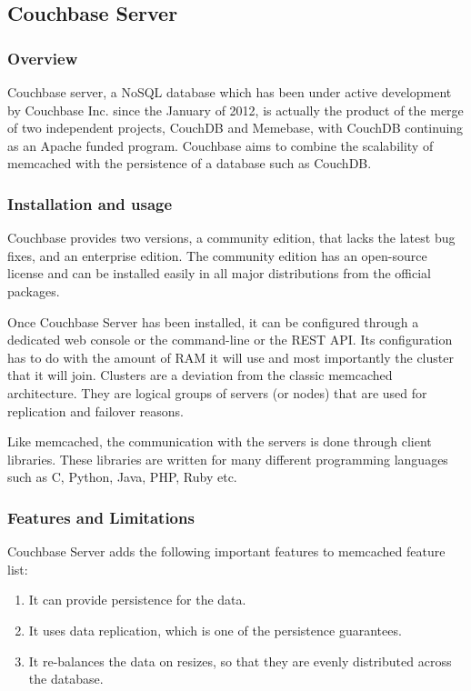 \subsection{Couchbase Server}

\subsubsection{Overview}

Couchbase server, a NoSQL database which has been under active development by 
Couchbase Inc.  since the January of 2012, is actually the product of the merge 
of two independent projects, CouchDB and Memebase, with CouchDB continuing as 
an Apache funded program.  Couchbase aims to combine the scalability of 
memcached with the persistence of a database such as CouchDB. 

\subsubsection{Installation and usage}

Couchbase provides two versions, a community edition, that lacks the latest bug 
fixes, and an enterprise edition. The community edition has an open-source 
license and can be installed easily in all major distributions from the 
official packages.

Once Couchbase Server has been installed, it can be configured through a 
dedicated web console or the command-line or the REST API. Its configuration 
has to do with the amount of RAM it will use and most importantly the cluster 
that it will join. Clusters are a deviation from the classic memcached 
architecture. They are logical groups of servers (or nodes) that are used for 
replication and failover reasons.

Like memcached, the communication with the servers is done through client 
libraries. These libraries are written for many different programming languages 
such as C, Python, Java, PHP, Ruby etc.

\subsubsection{Features and Limitations}

Couchbase Server adds the following important features to memcached feature 
list:

\begin{enumerate}
	\item It can provide persistence for the data.
	\item It uses data replication, which is one of the persistence guarantees.  
	\item It re-balances the data on resizes, so that they are evenly 
		distributed across the database.
\end{enumerate}

